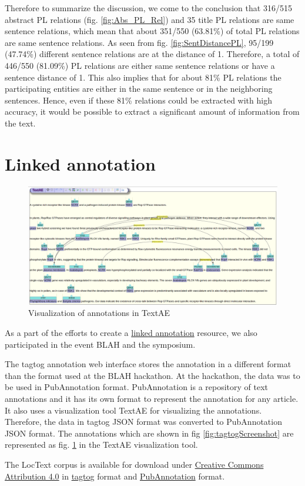 
Therefore to summarize the discussion, we come to the conclusion that 316/515 abstract PL relations (fig. \ref{fig:Abs_PL_Rel}) and 35 title PL relations are same sentence relations, which mean that about 351/550 (63.81\%) of total PL relations are same sentence relations. As seen from  fig. \ref{fig:SentDistancePL}, 95/199 (47.74\%) different sentence relations are at the distance of 1. Therefore, a total of 446/550 (81.09\%) PL relations are either same sentence relations or have a sentence distance of 1. This also implies that for about 81\% PL relations the participating entities are either in the same sentence or in the neighboring sentences. Hence, even if these 81\% relations could be extracted with high accuracy, it would be possible to extract a significant amount of information from the text.

\section{Linked annotation}


\begin{figure}
\centering
\includegraphics[scale=0.25]{figures/TextAE_Vis.png}
\caption{Visualization of annotations in TextAE}\label{fig:TextAEVis}
\end{figure}

As a part of the efforts to create a \hyperref[http://2015.linkedannotation.org/background]{linked annotation} resource, we also participated in the event BLAH \cite{blah} and the symposium. 

The tagtog annotation web interface stores the annotation in a different format than the format used at the BLAH hackathon. At the hackathon, the data was to be used in PubAnnotation format. PubAnnotation \cite{kim2012pubannotation} is a repository of text annotations and it has its own format to represent the annotation for any article. It also uses a visualization tool TextAE \cite{textae} for visualizing the annotations. Therefore, the data in tagtog JSON format was converted to PubAnnotation JSON format. The annotations which are shown in fig \ref{fig:tagtogScreenshot} are represented as fig. \ref{fig:TextAEVis} in the TextAE visualization tool. 

The LocText corpus is available for download under \hyperref[https://creativecommons.org/licenses/by/4.0/]{Creative Commons Attribution 4.0} in \hyperref[https://www.tagtog.net/-corpora/loctext]{tagtog} format and \hyperref[http://pubannotation.org/projects/LocText]{PubAnnotation} format.